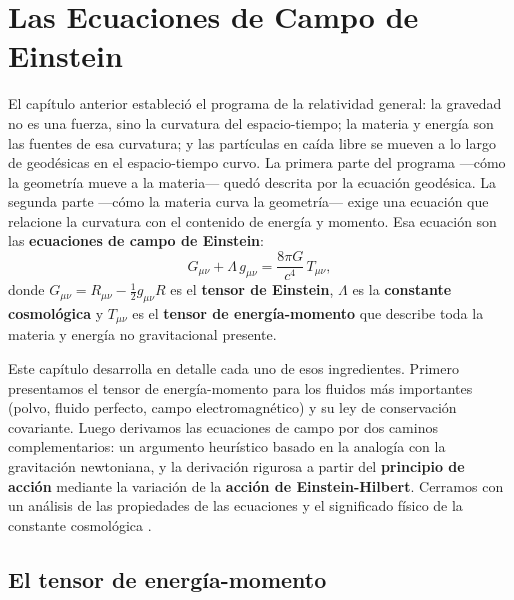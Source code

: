 
\chapter{Las Ecuaciones de Campo de Einstein}
\label{cap:ecuaciones_campo}

El capítulo anterior estableció el programa de la relatividad general: la gravedad no es una fuerza, sino la curvatura del espacio-tiempo; la materia y energía son las fuentes de esa curvatura; y las partículas en caída libre se mueven a lo largo de geodésicas en el espacio-tiempo curvo. La primera parte del programa —cómo la geometría mueve a la materia— quedó descrita por la ecuación geodésica. La segunda parte —cómo la materia curva la geometría— exige una ecuación que relacione la curvatura con el contenido de energía y momento. Esa ecuación son las \textbf{ecuaciones de campo de Einstein}:
\begin{equation}
  \boxed{G_{\mu\nu} + \Lambda\,g_{\mu\nu} = \frac{8\pi G}{c^4}\,T_{\mu\nu},}
  \label{eq:Einstein_completa}
\end{equation}
donde $G_{\mu\nu} = R_{\mu\nu} - \tfrac{1}{2}g_{\mu\nu}R$ es el \textbf{tensor de Einstein}, $\Lambda$ es la \textbf{constante cosmológica} y $T_{\mu\nu}$ es el \textbf{tensor de energía-momento} que describe toda la materia y energía no gravitacional presente.

Este capítulo desarrolla en detalle cada uno de esos ingredientes. Primero presentamos el tensor de energía-momento para los fluidos más importantes (polvo, fluido perfecto, campo electromagnético) y su ley de conservación covariante. Luego derivamos las ecuaciones de campo por dos caminos complementarios: un argumento heurístico basado en la analogía con la gravitación newtoniana, y la derivación rigurosa a partir del \textbf{principio de acción} mediante la variación de la \textbf{acción de Einstein-Hilbert}. Cerramos con un análisis de las propiedades de las ecuaciones y el significado físico de la constante cosmológica \cite{Carroll2004, Misner1973, Wald1984}.

\section{El tensor de energía-momento}
\label{sec:Tmunu}

